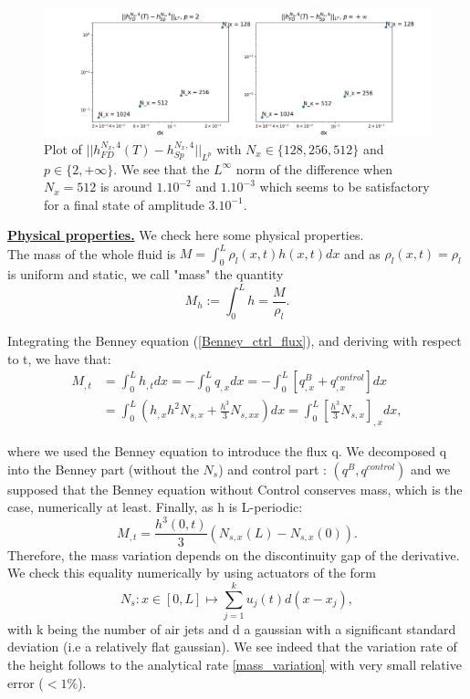\documentclass[12pt]{article}
\begin{document}
\begin{figure}
    \hspace*{-2cm}
    \includegraphics[width=1.2\linewidth]{Verif_scheme/Comparison_scheme_BDF4.png}
    \caption{Plot of $||h_{FD}^{N_x, 4}(T)-h_{Sp}^{N_x,4}||_{L^p}$ with $N_x \in \{128, 256, 512\}$ and $p \in \{2, +\infty\}.$
     We see that the $L^{\infty}$ norm of the difference when $N_x=512$ is around $1.10^{-2}$ and $1.10^{-3}$ which seems to be satisfactory for a final state of amplitude $3.10^{-1}$. }
    \label{fig:plot_comparison_FD_Sp_methods}
\end{figure}
\vspace{0.5cm}

\underline{\textbf{Physical properties.}}
We check here some physical properties.
\\

The mass of the whole fluid is $M=\int_0^L\rho_l(x,t)h(x,t)dx$ and as $\rho_l(x,t)=\rho_l$ is uniform and static, we call "mass" the quantity 
\begin{equation}
M_h := \int_0^Lh = \frac{M}{\rho_l}.
\end{equation}

Integrating the Benney equation (\ref{Benney_ctrl_flux}), and deriving with respect to t, we have that: 
\begin{align*}
    M_{,t}&=\int_0^Lh_{,t}dx=-\int_0^L q_{,x}dx = -\int_0^L[q^B_{,x}+q^{control}_{,x}]dx \\ &= \int_0^L(h_{,x}h^2N_{s,x}+\frac{h^3}{3}N_{s,xx})dx=\int_0^L[\frac{h^3}{3}N_{s,x}]_{,x}dx ,
\end{align*}

where we used the Benney equation to introduce the flux q. We decomposed q into the Benney part (without the $N_s$) and control part : $(q^B, q^{control})$ and we supposed that the Benney equation without Control conserves mass, which is the case, numerically at least.
Finally, as h is L-periodic: 
\begin{equation}\label{mass_variation}
M_{,t} = \frac{h^3(0,t)}{3}(N_{s,x}(L)-N_{s,x}(0)).
\end{equation}
Therefore, the mass variation depends on the discontinuity gap of the derivative. 
We check this equality numerically by using actuators of the form 
$$N_s: x\in [0,L] \mapsto \sum_{j=1}^{k}u_j(t)d(x-x_j),$$ with k being the number of air 
jets and d a gaussian with a significant standard deviation (i.e a relatively flat gaussian). We
 see indeed that the variation rate of the height follows to the analytical rate \eqref{mass_variation} with very small relative error
  ($<1\%$).  
\\
\end{document}
